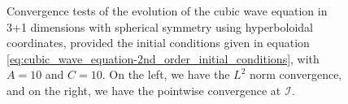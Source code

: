 \begin{figure}[h]
\begin{subfigure}[b]{0.45\textwidth}
    \end{subfigure}
    \caption{Convergence tests of the evolution of the cubic wave equation in 3+1 dimensions with spherical symmetry using hyperboloidal coordinates, provided the initial conditions given in equation \eqref{eq:cubic_wave_equation-2nd_order_initial_conditions}, with $A=10$ and $C=10$. On the left, we have the $L^2$ norm convergence, and on the right, we have the pointwise convergence at $\mathscr{I}$.}
    \label{fig:cubic_wave_eq_convergence-10}
\end{figure}